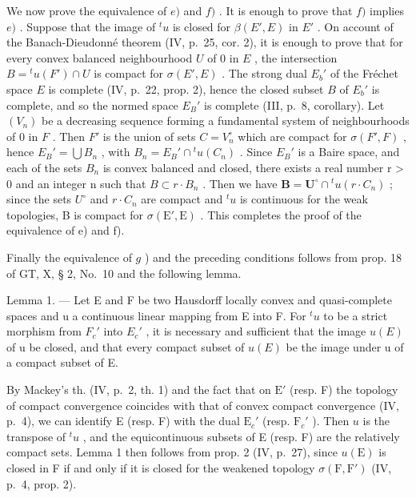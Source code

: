 We now prove the equivalence of \(e)\) and \(f)\) . It is enough to prove that \(f)\) implies \(e)\) . Suppose that the image of \({}^t u\) is closed for \(\beta(E', E)\) in \(E'\) . On account of the Banach-Dieudonné theorem (IV, p.~25, cor. 2), it is enough to prove that for every convex balanced neighbourhood \(U\) of \(0\) in \(E\) , the intersection \(B = {}^t u(F') \cap U\) is compact for \(\sigma(E', E)\) . The strong dual \(E_b'\) of the Fréchet space \(E\) is complete (IV, p.~22, prop. 2), hence the closed subset \(B\) of \(E_b'\) is complete, and so the normed space \(E_B'\) is complete (III, p.~8, corollary). Let \((V_n)\) be a decreasing sequence forming a fundamental system of neighbourhoods of \(0\) in \(F\) . Then \(F'\) is the union of sets \(C = V_n^\circ\) which are compact for \(\sigma(F', F)\) , hence \(E_B' = \bigcup B_n\) , with \(B_n = E_B' \cap {}^t u(C_n)\) . Since \(E_B'\) is a Baire space, and each of the sets \(B_{n}\) is convex balanced and closed, there exists a real number r \textgreater{} 0 and an integer n such that \(B \subset r \cdot B_{n}\) . Then we have \(\mathbf{B} = \mathbf{U}^{\circ} \cap {}^{t} u(r \cdot C_{n})\) ; since the sets \(U^{\circ}\) and \(r \cdot C_{n}\) are compact and \({}^{t} u\) is continuous for the weak topologies, B is compact for \(\sigma(\mathrm{E}', \mathrm{E})\) . This completes the proof of the equivalence of e) and f).

Finally the equivalence of \(g\) ) and the preceding conditions follows from prop. 18 of GT, X, § 2, No.~10 and the following lemma.

Lemma 1. --- Let E and F be two Hausdorff locally convex and quasi-complete spaces and u a continuous linear mapping from E into F. For \({}^t u\) to be a strict morphism from \(F_{c}'\) into \(E_{c}'\) , it is necessary and sufficient that the image \(u(E)\) of u be closed, and that every compact subset of \(u(E)\) be the image under u of a compact subset of E.

By Mackey's th. (IV, p.~2, th. 1) and the fact that on \(\mathrm{E}'\) (resp. F) the topology of compact convergence coincides with that of convex compact convergence (IV, p.~4), we can identify E (resp. F) with the dual \(\mathrm{E}_c'\) (resp. \(\mathrm{F}_c'\) ). Then \(u\) is the transpose of \({}^t u\) , and the equicontinuous subsets of E (resp. F) are the relatively compact sets. Lemma 1 then follows from prop. 2 (IV, p.~27), since \(u(\mathrm{E})\) is closed in F if and only if it is closed for the weakened topology \(\sigma(\mathrm{F}, \mathrm{F}')\) (IV, p.~4, prop. 2).


